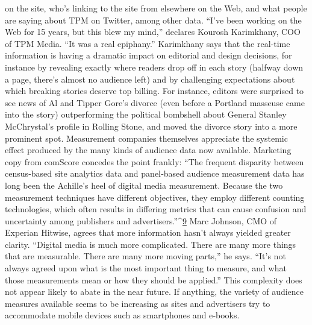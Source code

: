 on the site, who’s linking to the site from elsewhere on the Web, and what
people are saying about TPM on Twitter, among other data.
``I’ve been working on the Web for 15 years, but this blew my mind,''
declares Kourosh Karimkhany, COO of TPM Media. ``It was a real
epiphany.'' Karimkhany says that the real‐time information is having a
dramatic impact on editorial and design decisions, for instance by
revealing exactly where readers drop off in each story (halfway down a
page, there’s almost no audience left) and by challenging expectations
about which breaking stories deserve top billing. For instance, editors
were surprised to see news of Al and Tipper Gore’s divorce (even before a
Portland masseuse came into the story) outperforming the political
bombshell about General Stanley McChrystal’s profile in Rolling Stone,
and moved the divorce story into a more prominent spot.
Measurement companies themselves appreciate the systemic effect
produced by the many kinds of audience data now available. Marketing
copy from comScore concedes the point frankly:
``The frequent disparity between census‐based site analytics data
and panel‐based audience measurement data has long been the
Achille’s heel of digital media measurement. Because the two
measurement techniques have different objectives, they employ
different counting technologies, which often results in differing
metrics that can cause confusion and uncertainty among publishers
and advertisers.''^{\href{#endnotes}{9}}
Marc Johnson, CMO of Experian Hitwise, agrees that more information
hasn’t always yielded greater clarity. ``Digital media is much more
complicated. There are many more things that are measurable. There are
many more moving parts,'' he says. ``It’s not always agreed upon what is
the most important thing to measure, and what those measurements mean
or how they should be applied.''
This complexity does not appear likely to abate in the near future. If
anything, the variety of audience measures available seems to be
increasing as sites and advertisers try to accommodate mobile devices
such as smartphones and e‐books.
